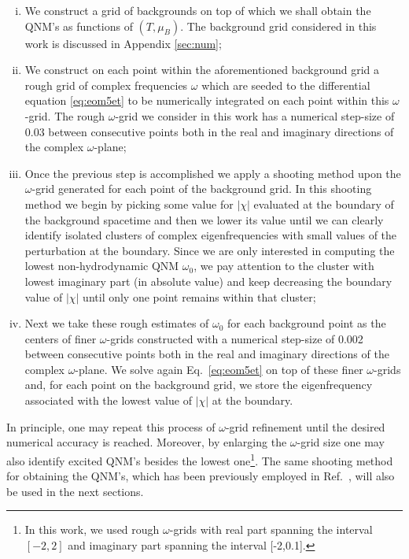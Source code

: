 \documentclass[aps,prd,showkeys,superscriptaddress,singlecolumn,nofootinbib,floatfix]{revtex4-1}
\begin{document}
\begin{enumerate}[i.]

\item We construct a grid of backgrounds on top of which we shall obtain the QNM's as functions of $(T,\mu_B)$. The background grid considered in this work is discussed in Appendix \ref{sec:num};

\item We construct on each point within the aforementioned background grid a rough grid of complex frequencies $\omega$ which are seeded to the differential equation \eqref{eq:eom5et} to be numerically integrated on each point within this $\omega$-grid. The rough $\omega$-grid we consider in this work has a numerical step-size of 0.03 between consecutive points both in the real and imaginary directions of the complex $\omega$-plane; 

\item Once the previous step is accomplished we apply a shooting method upon the $\omega$-grid generated for each point of the background grid. In this shooting method we begin by picking some value for $|\chi|$ evaluated at the boundary of the background spacetime and then we lower its value until we can clearly identify isolated clusters of complex eigenfrequencies with small values of the perturbation at the boundary. Since we are only interested in computing the lowest non-hydrodynamic QNM $\omega_0$, we pay attention to the cluster with lowest imaginary part (in absolute value) and keep decreasing the boundary value of $|\chi|$ until only one point remains within that cluster;

\item Next we take these rough estimates of $\omega_0$ for each background point as the centers of finer $\omega$-grids constructed with a numerical step-size of 0.002 between consecutive points both in the real and imaginary directions of the complex $\omega$-plane. We solve again Eq.\ \eqref{eq:eom5et} on top of these finer $\omega$-grids and, for each point on the background grid, we store the eigenfrequency associated with the lowest value of $|\chi|$ at the boundary.

\end{enumerate}

In principle, one may repeat this process of $\omega$-grid refinement until the desired numerical accuracy is reached. Moreover, by enlarging the $\omega$-grid size one may also identify excited QNM's besides the lowest one\footnote{In this work, we used rough $\omega$-grids with real part spanning the interval $[-2,2]$ and imaginary part spanning the interval [-2,0.1].}. The same shooting method for obtaining the QNM's, which has been previously employed in Ref.\ \cite{Rougemont:2015wca}, will also be used in the next sections.
\end{document}
